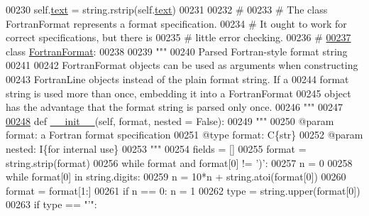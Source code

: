 \begin{DoxyCode}
{{{{00230         self.\hyperlink{classpyneb_1_1utils_1_1_fortran_format_1_1_fortran_line_a70d4893b8dd8ae61297b1d3e4b8bc612}{text} = string.rstrip(self.\hyperlink{classpyneb_1_1utils_1_1_fortran_format_1_1_fortran_line_a70d4893b8dd8ae61297b1d3e4b8bc612}{text})
00231 
00232 \textcolor{comment}{#}
00233 \textcolor{comment}{# The class FortranFormat represents a format specification.}
00234 \textcolor{comment}{# It ought to work for correct specifications, but there is}
00235 \textcolor{comment}{# little error checking.}
00236 \textcolor{comment}{#}
\hypertarget{_fortran_format_8py_source_l00237}{}\hyperlink{classpyneb_1_1utils_1_1_fortran_format_1_1_fortran_format}{00237} \textcolor{keyword}{class }\hyperlink{classpyneb_1_1utils_1_1_fortran_format_1_1_fortran_format}{FortranFormat}:
00238 
00239     \textcolor{stringliteral}{"""}
00240 \textcolor{stringliteral}{    Parsed Fortran-style format string}
00241 \textcolor{stringliteral}{}
00242 \textcolor{stringliteral}{    FortranFormat objects can be used as arguments when constructing}
00243 \textcolor{stringliteral}{    FortranLine objects instead of the plain format string. If a}
00244 \textcolor{stringliteral}{    format string is used more than once, embedding it into a FortranFormat}
00245 \textcolor{stringliteral}{    object has the advantage that the format string is parsed only once.}
00246 \textcolor{stringliteral}{    """}
00247 
\hypertarget{_fortran_format_8py_source_l00248}{}\hyperlink{classpyneb_1_1utils_1_1_fortran_format_1_1_fortran_format_a7fc0109f1fa73801ad3795463473e41a}{00248}     \textcolor{keyword}{def }\hyperlink{classpyneb_1_1utils_1_1_fortran_format_1_1_fortran_format_a7fc0109f1fa73801ad3795463473e41a}{\_\_init\_\_}(self, format, nested = False):
00249         \textcolor{stringliteral}{"""}
00250 \textcolor{stringliteral}{        @param format: a Fortran format specification}
00251 \textcolor{stringliteral}{        @type format: C\{str\}}
00252 \textcolor{stringliteral}{        @param nested: I\{for internal use\}}
00253 \textcolor{stringliteral}{        """}
00254         fields = []
00255         format = string.strip(format)
00256         \textcolor{keywordflow}{while} format \textcolor{keywordflow}{and} format[0] != \textcolor{stringliteral}{')'}:
00257             n = 0
00258             \textcolor{keywordflow}{while} format[0] \textcolor{keywordflow}{in} string.digits:
00259                 n = 10*n + string.atoi(format[0])
00260                 format = format[1:]
00261             \textcolor{keywordflow}{if} n == 0: n = 1
00262             type = string.upper(format[0])
00263             \textcolor{keywordflow}{if} type == \textcolor{stringliteral}{"'"}:
}}}}
\end{DoxyCode}
